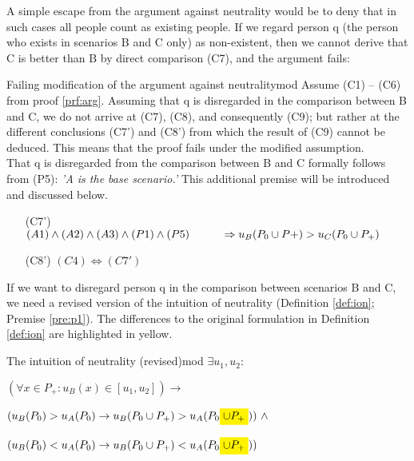 A simple escape from the argument against neutrality would be to deny that in such cases all people count as existing people. If we regard person q (the person who exists in scenarios B and C only) as non-existent, then we cannot derive that C is better than B by direct comparison (C7), and the argument fails: 
\begin{Proof}{Failing modification of the argument against neutrality}{mod}
Assume (C1) -- (C6) from proof \ref{prf:arg}. Assuming that q is disregarded in the comparison between B and C, we do not arrive at (C7), (C8), and consequently (C9); but rather at the different conclusions (C7') and (C8') from which the result of (C9) cannot be deduced. This means that the proof fails under the modified assumption. \\
That q is disregarded from the comparison between B and C formally follows from (P5): \emph{'A is the base scenario.'} This additional premise will be introduced and discussed below. 
\begin{enumerate}
\item[(C7')] \hspace{1cm} $(A1) \wedge (A2) \wedge (A3) \wedge (P1) \wedge (P5) \\ 
\hspace*{1cm} \Rightarrow  u_B(P_0 \cup P+) > u_C(P_0 \cup P_+)$
\item[(C8')] \hspace{1cm} $(C4) \Leftrightarrow (C7')$ 
\end{enumerate}
\end{Proof}

If we want to disregard person q in the comparison between scenarios B and C, we need a revised version of the intuition of neutrality (Definition \ref{def:ion}; Premise \ref{pre:p1}). The differences to the original formulation in Definition \ref{def:ion} are highlighted in yellow. 

\begin{Definition}{The intuition of neutrality (revised)}{mod} 
$
  \exists u_1, u_2: 
$

\hspace{.5cm} $
  (\forall x \in P_+ : u_B(x) \in [u_1, u_2] )
  \rightarrow 
$

\hspace{1cm} $
  ( u_B(P_0) > u_A(P_0) 
  \rightarrow 
  u_B(P_0 \cup P_+) > u_A(P_0 \highlight{ \cup P_+}) ) 
  \ \wedge
$

\hspace{1cm} $
  ( u_B(P_0) < u_A(P_0) 
  \rightarrow 
  u_B(P_0 \cup P_+) < u_A(P_0 \highlight{ \cup P_+})) 
$
\end{Definition}

